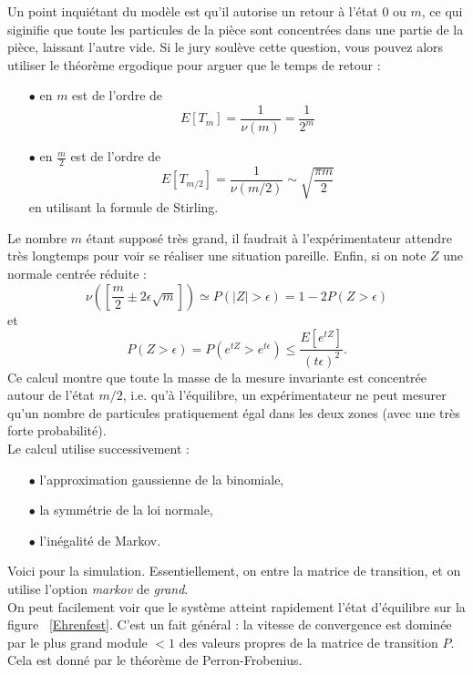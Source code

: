 Un point inquiétant du modèle est qu'il autorise un retour à l'état $0$ ou $m$, ce qui siginifie que toute les particules de la pièce sont concentrées dans une partie de la pièce, laissant l'autre vide. Si le jury soulève cette question, vous pouvez alors utiliser le théorème ergodique pour arguer que le temps de retour :\\

\begin{itemize}
\item[$\bullet$] en $m$ est de l'ordre de 
\[E[T_m]=\frac{1}{\nu(m)}=\frac{1}{2^m} \]
\item[$\bullet$] en $\frac{m}{2}$ est de l'ordre de 
\[E[T_{m/2}]=\frac{1}{\nu(m/2)}\sim\sqrt{\frac{\pi m}{2}} \]
en utilisant la formule de Stirling.\\
\end{itemize}

Le nombre $m$ étant supposé très grand, il faudrait à l'expérimentateur attendre très longtemps pour voir se réaliser une situation pareille. Enfin, si on note $Z$ une normale centrée réduite :
\[\nu([\frac{m}{2}\pm 2\epsilon \sqrt{m}]) \simeq P(|Z|>\epsilon)=1-2P(Z>\epsilon) \]
et 
\[P(Z>\epsilon)=P(e^{tZ}>e^{t\epsilon})\leq \frac{E[e^{tZ}]}{(t\epsilon)^2}.\]
Ce calcul montre que toute la masse de la mesure invariante est concentrée autour de l'état $m/2$, i.e. qu'à l'équilibre, un expérimentateur ne peut mesurer qu'un nombre de particules pratiquement égal dans les deux zones (avec une très forte probabilité).\\

Le calcul utilise successivement :
\begin{itemize}
\item[$\bullet$] l'approximation gaussienne de la binomiale,
\item[$\bullet$] la symmétrie de la loi normale,
\item[$\bullet$] l'inégalité de Markov.
\end{itemize}

Voici pour la simulation. Essentiellement, on entre la matrice de transition, et on utilise l'option \textit{markov} de \textit{grand}.\\



On peut facilement voir que le système atteint rapidement l'état d'équilibre sur la figure ~\ref{Ehrenfest}. C'est un fait général : la vitesse de convergence est dominée par le plus grand module $<1$ des valeurs propres de la matrice de transition $P$. Cela est donné par le théorème de Perron-Frobenius.

